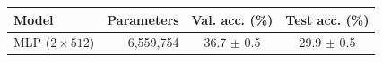 \begin{tabular}{l r c c}
\toprule
Model & Parameters & Val. acc. (\%) & Test acc. (\%) \\
\midrule
MLP ($2\times512$) & 6,559,754 & 36.7 $\pm$ 0.5 & 29.9 $\pm$ 0.5 \\
\bottomrule
\end{tabular}

